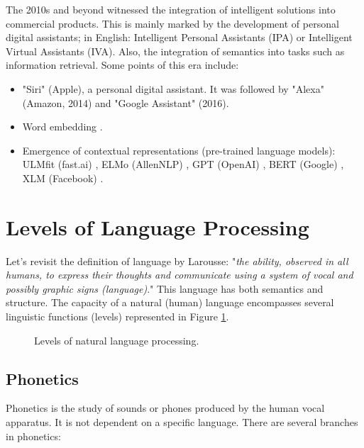 \documentclass{KBook}
\begin{document}
The 2010s and beyond witnessed the integration of intelligent solutions into commercial products. This is mainly marked by the development of personal digital assistants; in English: Intelligent Personal Assistants (IPA) or Intelligent Virtual Assistants (IVA). Also, the integration of semantics into tasks such as information retrieval. Some points of this era include:
\begin{itemize}
	\item {} "Siri" (Apple), a personal digital assistant. It was followed by "Alexa" (Amazon, 2014) and "Google Assistant" (2016).
	\item {} Word embedding \cite{2014-lebret-collobert}.
	\item {} Emergence of contextual representations (pre-trained language models): ULMfit (fast.ai) \cite{2018-howard-ruder}, ELMo (AllenNLP) \cite{2018-peters-al}, GPT (OpenAI) \cite{2018-radford-al}, BERT (Google) \cite{2018-devlin-al}, XLM (Facebook) \cite{2019-lample-conneau}.
\end{itemize}

\section{Levels of Language Processing}

Let's revisit the definition of language by Larousse: "\textit{the ability, observed in all humans, to express their thoughts and communicate using a system of vocal and possibly graphic signs (language)}." This language has both semantics and structure. The capacity of a natural (human) language encompasses several linguistic functions (levels) represented in Figure \ref{fig:levels}.

\begin{figure}[ht]
	\centering 
	\caption{Levels of natural language processing.}
	\label{fig:levels}
\end{figure}

\subsection{Phonetics}

Phonetics is the study of sounds or phones produced by the human vocal apparatus. It is not dependent on a specific language. There are several branches in phonetics:
\end{document}
